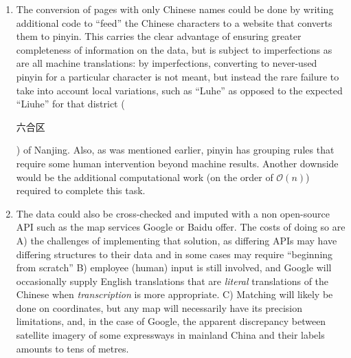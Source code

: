 \documentclass{article}
\begin{document}
\begin{enumerate}
\item The conversion of pages with only Chinese names could be done by writing additional code to ``feed'' the Chinese characters to a website that converts them to pinyin. This carries the clear advantage of ensuring greater completeness of information on the data, but is subject to imperfections as are all machine translations: by imperfections, converting to never-used pinyin for a particular character is not meant, but instead the rare failure to take into account local variations, such as ``Luhe'' as opposed to the expected ``Liuhe'' for that district (\begin{CJK}{UTF8}{gbsn}六合区\end{CJK}) of Nanjing. Also, as was mentioned earlier, pinyin has grouping rules that require some human intervention beyond machine results. Another downside would be the additional computational work (on the order of $\mathcal{O}(n)$) required to complete this task.
\item The data could also be cross-checked and imputed with a non open-source API such as the map services Google or Baidu offer. The costs of doing so are A) the challenges of implementing that solution, as differing APIs may have differing structures to their data and in some cases may require ``beginning from scratch'' B) employee (human) input is still involved, and Google will occasionally supply English translations that are \textit{literal} translations of the Chinese when \textit{transcription} is more appropriate. C) Matching will likely be done on coordinates, but any map will necessarily have its precision limitations, and, in the case of Google, the apparent discrepancy between satellite imagery of some expressways in mainland China and their labels amounts to tens of metres.
\end{enumerate} 
\end{document}

